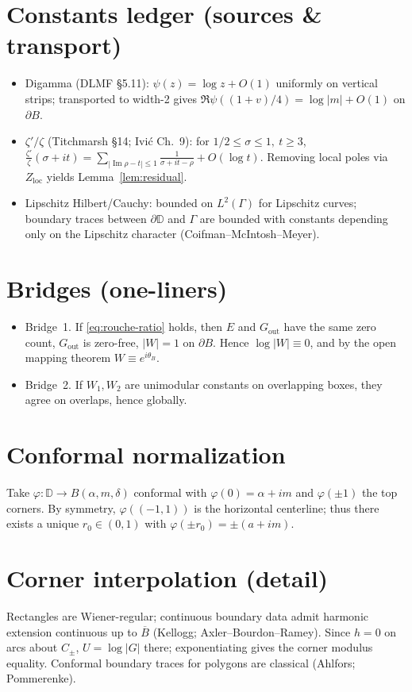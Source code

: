 \documentclass[11pt]{article}
\numberwithin{equation}{section}
\theoremstyle{remark}
\newcommand{\D}{\mathbb{D}}
\DeclareMathOperator{\Imag}{Im}
\newcommand{\Gout}{G_{\mathrm{out}}}
\newcommand{\Zloc}{Z_{\mathrm{loc}}}
\begin{document}
\section{Constants ledger (sources \& transport)}
\begin{itemize}
\item Digamma (DLMF §5.11): $\psi(z)=\log z+O(1)$ uniformly on vertical strips; transported to width-2 gives $\Re\psi((1+v)/4)=\log|m|+O(1)$ on $\partial B$.
\item $\zeta'/\zeta$ (Titchmarsh §14; Ivi\'c Ch.~9): for $1/2\le \sigma\le 1,\ t\ge 3$,
$\displaystyle \frac{\zeta'}{\zeta}(\sigma+it)=\sum_{|\Imag\rho-t|\le 1}\frac{1}{\sigma+it-\rho}+O(\log t)$.
Removing local poles via $\Zloc$ yields Lemma~\ref{lem:residual}.
\item Lipschitz Hilbert/Cauchy: bounded on $L^2(\Gamma)$ for Lipschitz curves; boundary traces between $\partial\D$ and $\Gamma$ are bounded with constants depending only on the Lipschitz character (Coifman--McIntosh--Meyer).
\end{itemize}

\section{Bridges (one-liners)}
\begin{itemize}
\item Bridge~1. If \eqref{eq:rouche-ratio} holds, then $E$ and $\Gout$ have the same zero count, $\Gout$ is zero-free, $|W|=1$ on $\partial B$. Hence $\log|W|\equiv 0$, and by the open mapping theorem $W\equiv e^{i\theta_B}$.
\item Bridge~2. If $W_1,W_2$ are unimodular constants on overlapping boxes, they agree on overlaps, hence globally.
\end{itemize}

\section{Conformal normalization}
Take $\varphi:\D\to B(\alpha,m,\delta)$ conformal with $\varphi(0)=\alpha+i m$ and $\varphi(\pm 1)$ the top corners. By symmetry, $\varphi((-1,1))$ is the horizontal centerline; thus there exists a unique $r_0\in(0,1)$ with $\varphi(\pm r_0)=\pm(a+im)$. %

\section{Corner interpolation (detail)}
Rectangles are Wiener-regular; continuous boundary data admit harmonic extension continuous up to $\overline B$ (Kellogg; Axler--Bourdon--Ramey). Since $h=0$ on arcs about $C_\pm$, $U=\log|G|$ there; exponentiating gives the corner modulus equality. Conformal boundary traces for polygons are classical (Ahlfors; Pommerenke).
\end{document}
